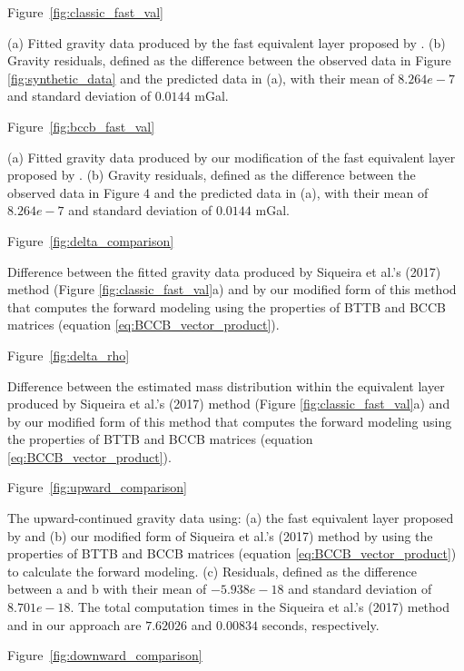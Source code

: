 \documentclass[paper]{geophysics}
\begin{document}
Figure~\ref{fig:classic_fast_val}

{(a) Fitted gravity data produced by the fast equivalent layer proposed by \cite{siqueira2017fast}. (b) Gravity residuals, defined as the difference between the observed data in Figure \ref{fig:synthetic_data} and the predicted data in (a), with their mean of $8.264e-7$ and standard deviation of $0.0144$ mGal.}
\newpage

Figure~\ref{fig:bccb_fast_val}

{(a) Fitted gravity data produced by our modification of the fast equivalent layer proposed by \cite{siqueira2017fast}. (b) Gravity residuals, defined as the difference between the observed data in Figure 4 and the predicted data in (a), with their mean of $8.264e-7$ and standard deviation of $0.0144$ mGal.}
\newpage

Figure~\ref{fig:delta_comparison}

{Difference between the fitted gravity data produced by Siqueira et al.'s (2017) method (Figure \ref{fig:classic_fast_val}a) and by our modified form of this method that computes the forward modeling using the properties of BTTB and BCCB matrices (equation \ref{eq:BCCB_vector_product}).}
\newpage

Figure~\ref{fig:delta_rho}

{Difference between the estimated mass distribution within the equivalent layer produced by Siqueira et al.'s (2017) method (Figure \ref{fig:classic_fast_val}a) and by our modified form of this method that computes the forward modeling using the properties of BTTB and BCCB matrices (equation \ref{eq:BCCB_vector_product}).}
\newpage

Figure~\ref{fig:upward_comparison}

{The upward-continued gravity data using: (a) the fast equivalent layer proposed by \cite{siqueira2017fast} and (b) our modified form of Siqueira et al.'s (2017) method by using the properties of BTTB and BCCB matrices (equation \ref{eq:BCCB_vector_product}) to calculate the forward modeling.  (c) Residuals, defined as the difference between a and b with their mean of $-5.938e-18$ and standard deviation of $8.701e-18$.  The total computation times in the Siqueira et al.'s (2017) method and in our approach are $7.62026$ and $0.00834$ seconds, respectively.}
\newpage

Figure~\ref{fig:downward_comparison}
\end{document}
